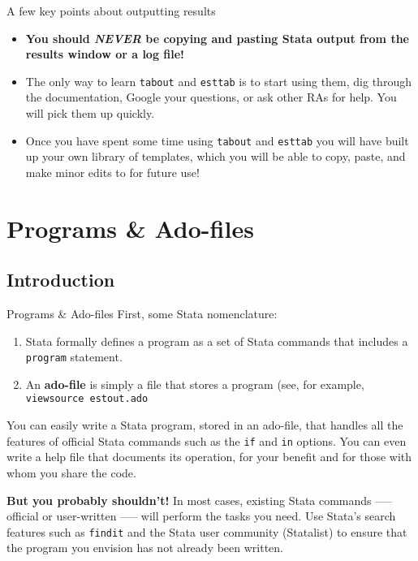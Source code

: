 \documentclass[fleqn, handout, 10pt]{beamer}
\def\lst{\lstinline}
\begin{document}
\begin{frame}{A few key points about outputting results}
    \begin{itemize}
	 \item \textbf{You should \emph{NEVER} be copying and pasting Stata output from the results window or a log file!} \pause
	 \item The only way to learn \lst=tabout= and \lst=esttab= is to start using them, dig through the documentation, Google your questions, or ask other RAs for help. You will pick them up quickly. \pause
	 \item Once you have spent some time using \lst=tabout= and \lst=esttab= you will have built up your own library of templates, which you will be able to copy, paste, and make minor edits to for future use!
    \end{itemize}
\end{frame}

\section{Programs \& Ado-files}

\subsection{Introduction}

\begin{frame}{Programs \& Ado-files}
    First, some Stata nomenclature:
    \begin{enumerate}
        \item Stata formally defines a program as a set of Stata commands that includes a \lst=program= statement.
        \item An \textbf{ado-file} is simply a file that stores a program (see, for example, \lst{viewsource estout.ado}
    \end{enumerate}

    You can easily write a Stata program, stored in an ado-file, that handles all the features of official Stata commands such as the \lst=if= and \lst=in= options. You can even write a help file that documents its operation, for your benefit and for those with whom you share the code.

    \textbf{But you probably shouldn’t!} In most cases, existing Stata commands —-- official or user-written --— will perform the tasks you need. Use Stata's search features such as \lst=findit= and the Stata user community (Statalist) to ensure that the program you envision has not already been written.
\end{frame}
\end{document}
